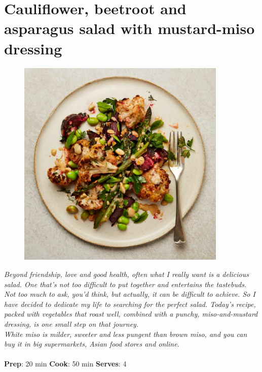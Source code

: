 \documentclass{book}
\begin{document}
\section{Cauliflower, beetroot and asparagus salad with mustard-miso dressing}
\begin{figure}
\centering\includegraphics[width=10cm,height=10cm,keepaspectratio]{Recipe_Pictures/Cauliflower,_beetroot_and_asparagus_salad_with_mustard-miso_dressing.png}
\end{figure}
\emph{Beyond friendship, love and good health, often what I really want is a delicious salad. One that’s not too difficult to put together and entertains the tastebuds. Not too much to ask, you’d think, but actually, it can be difficult to achieve. So I have decided to dedicate my life to searching for the perfect salad. Today’s recipe, packed with vegetables that roast well, combined with a punchy, miso-and-mustard dressing, is one small step on that journey.\\ 
White miso is milder, sweeter and less pungent than brown miso, and you can buy it in big supermarkets, Asian food stores and online.}\\\\ 
\textbf{Prep}: 20 min
\textbf{Cook}: 50 min
\textbf{Serves}: 4
\end{document}
